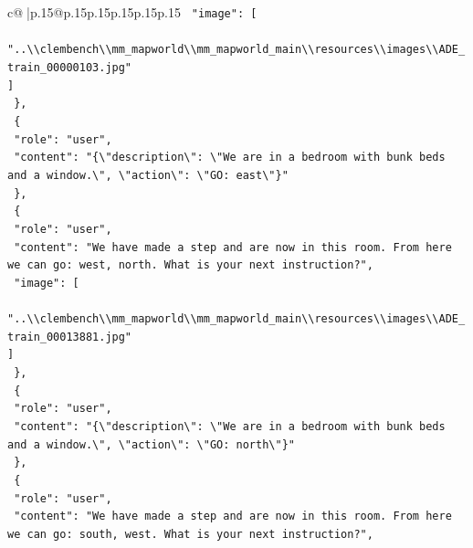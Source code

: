 \documentclass{article}
\begin{document}
{\begin{supertabular}{c@{$\;$}|p{.15\linewidth}@{}p{.15\linewidth}p{.15\linewidth}p{.15\linewidth}p{.15\linewidth}p{.15\linewidth}}
{{{\texttt{    "image": {[}} \\
\texttt{      "..\textbackslash{}\textbackslash{}clembench\textbackslash{}\textbackslash{}mm\_mapworld\textbackslash{}\textbackslash{}mm\_mapworld\_main\textbackslash{}\textbackslash{}resources\textbackslash{}\textbackslash{}images\textbackslash{}\textbackslash{}ADE\_train\_00000103.jpg"} \\
\texttt{    {]}} \\
\texttt{  \},} \\
\texttt{  \{} \\
\texttt{    "role": "user",} \\
\texttt{    "content": "\{\textbackslash{}"description\textbackslash{}": \textbackslash{}"We are in a bedroom with bunk beds and a window.\textbackslash{}", \textbackslash{}"action\textbackslash{}": \textbackslash{}"GO: east\textbackslash{}"\}"} \\
\texttt{  \},} \\
\texttt{  \{} \\
\texttt{    "role": "user",} \\
\texttt{    "content": "We have made a step and are now in this room. From here we can go: west, north. What is your next instruction?",} \\
\texttt{    "image": {[}} \\
\texttt{      "..\textbackslash{}\textbackslash{}clembench\textbackslash{}\textbackslash{}mm\_mapworld\textbackslash{}\textbackslash{}mm\_mapworld\_main\textbackslash{}\textbackslash{}resources\textbackslash{}\textbackslash{}images\textbackslash{}\textbackslash{}ADE\_train\_00013881.jpg"} \\
\texttt{    {]}} \\
\texttt{  \},} \\
\texttt{  \{} \\
\texttt{    "role": "user",} \\
\texttt{    "content": "\{\textbackslash{}"description\textbackslash{}": \textbackslash{}"We are in a bedroom with bunk beds and a window.\textbackslash{}", \textbackslash{}"action\textbackslash{}": \textbackslash{}"GO: north\textbackslash{}"\}"} \\
\texttt{  \},} \\
\texttt{  \{} \\
\texttt{    "role": "user",} \\
\texttt{    "content": "We have made a step and are now in this room. From here we can go: south, west. What is your next instruction?",} \\
}}}
\end{supertabular}}
\end{document}
